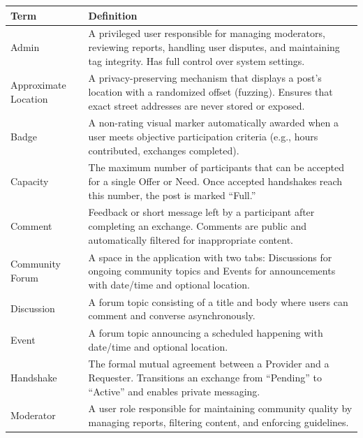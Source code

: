 \documentclass[11pt,a4paper]{report}
\begin{document}
\begin{longtable}{|p{3.5cm}|p{11cm}|}
    \hline
    \textbf{Term}        & \textbf{Definition}                                                                                                                                                     \\
    \hline
    \endhead
    Admin                & A privileged user responsible for managing moderators, reviewing reports, handling user disputes, and maintaining tag integrity. Has full control over system settings. \\
    \hline
    Approximate Location & A privacy-preserving mechanism that displays a post's location with a randomized offset (fuzzing). Ensures that exact street addresses are never stored or exposed.     \\
    \hline
    Badge                & A non-rating visual marker automatically awarded when a user meets objective participation criteria (e.g., hours contributed, exchanges completed).                     \\
    \hline
    Capacity             & The maximum number of participants that can be accepted for a single Offer or Need. Once accepted handshakes reach this number, the post is marked ``Full.''            \\
    \hline
    Comment              & Feedback or short message left by a participant after completing an exchange. Comments are public and automatically filtered for inappropriate content.                 \\
    \hline
    Community Forum      & A space in the application with two tabs: Discussions for ongoing community topics and Events for announcements with date/time and optional location.                   \\
    \hline
    Discussion           & A forum topic consisting of a title and body where users can comment and converse asynchronously.                                                                       \\
    \hline
    Event                & A forum topic announcing a scheduled happening with date/time and optional location.                                                                                    \\
    \hline
    Handshake            & The formal mutual agreement between a Provider and a Requester. Transitions an exchange from ``Pending'' to ``Active'' and enables private messaging.                   \\
    \hline
    Moderator            & A user role responsible for maintaining community quality by managing reports, filtering content, and enforcing guidelines.                                             \\

\end{longtable}
\end{document}
